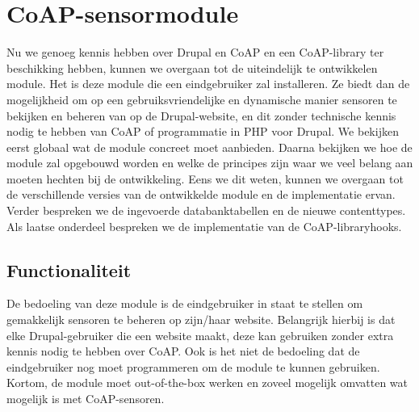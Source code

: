 \chapter{CoAP-sensormodule} \label{sensormodule}

Nu we genoeg kennis hebben over Drupal en CoAP en een CoAP-library ter beschikking hebben, kunnen we overgaan tot de uiteindelijk te ontwikkelen module. Het is deze module die een eindgebruiker zal installeren. Ze biedt dan de mogelijkheid om op een gebruiksvriendelijke en dynamische manier sensoren te bekijken en beheren van op de Drupal-website, en dit zonder technische kennis nodig te hebben van CoAP of programmatie in PHP voor Drupal. We bekijken eerst globaal wat de module concreet moet aanbieden. Daarna bekijken we hoe de module zal opgebouwd worden en welke de principes zijn waar we veel belang aan moeten hechten bij de ontwikkeling. Eens we dit weten, kunnen we overgaan tot de verschillende versies van de ontwikkelde module en de implementatie ervan. Verder bespreken we de ingevoerde databanktabellen en de nieuwe contenttypes. Als laatse onderdeel bespreken we de implementatie van de CoAP-libraryhooks.

\section{Functionaliteit}

De bedoeling van deze module is de eindgebruiker in staat te stellen om gemakkelijk sensoren te beheren op zijn/haar website. Belangrijk hierbij is dat elke Drupal-gebruiker die een website maakt, deze kan gebruiken zonder extra kennis nodig te hebben over CoAP. Ook is het niet de bedoeling dat de eindgebruiker nog moet programmeren om de module te kunnen gebruiken. Kortom, de module moet out-of-the-box werken en zoveel mogelijk omvatten wat mogelijk is met CoAP-sensoren.\\

